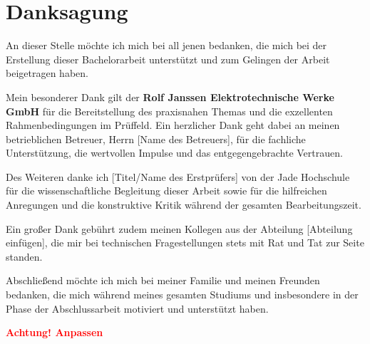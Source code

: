 
\section*{Danksagung}


An dieser Stelle möchte ich mich bei all jenen bedanken, die mich bei der Erstellung dieser Bachelorarbeit unterstützt und zum Gelingen der Arbeit beigetragen haben.

Mein besonderer Dank gilt der \textbf{ Rolf Janssen Elektrotechnische Werke GmbH} für die Bereitstellung des praxisnahen Themas und die exzellenten Rahmenbedingungen im Prüffeld. Ein herzlicher Dank geht dabei an meinen betrieblichen Betreuer, Herrn [Name des Betreuers], für die fachliche Unterstützung, die wertvollen Impulse und das entgegengebrachte Vertrauen.

Des Weiteren danke ich [Titel/Name des Erstprüfers] von der Jade Hochschule für die wissenschaftliche Begleitung dieser Arbeit sowie für die hilfreichen Anregungen und die konstruktive Kritik während der gesamten Bearbeitungszeit.

Ein großer Dank gebührt zudem meinen Kollegen aus der Abteilung [Abteilung einfügen], die mir bei technischen Fragestellungen stets mit Rat und Tat zur Seite standen.

Abschließend möchte ich mich bei meiner Familie und meinen Freunden bedanken, die mich während meines gesamten Studiums und insbesondere in der Phase der Abschlussarbeit motiviert und unterstützt haben.



\textcolor{red}{\textbf{Achtung! Anpassen}}
